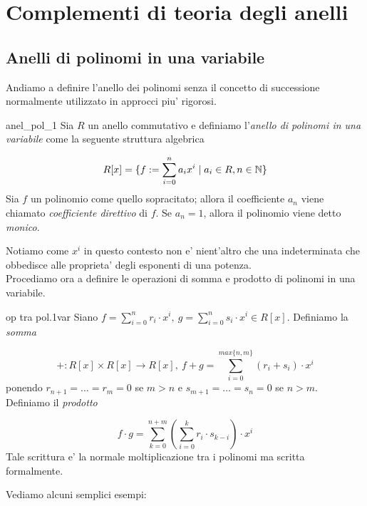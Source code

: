 \section{Complementi di teoria degli anelli}

\subsection{Anelli di polinomi in una variabile}

Andiamo a definire l'anello dei polinomi senza il concetto di successione normalmente 
utilizzato in approcci piu' rigorosi.


\begin{defn}{anel_pol_1}
Sia $R$ un anello commutativo e definiamo l'\emph{anello di polinomi in una variabile}
come la seguente struttura algebrica

\begin{equation}
R[x] = \{ f:= \sum\limits_{i=0}^{n}a_i x^i \mid a_i \in R, n\in \mathbb{N}\} 
\end{equation}
Sia $f$ un polinomio come quello sopracitato; allora il coefficiente $a_n$ viene chiamato 
\emph{coefficiente direttivo} di $f$. Se $a_n=1$, allora il polinomio viene detto \emph{monico}.
\end{defn}
Notiamo come $x^i$ in questo contesto non e' nient'altro che una indeterminata che
obbedisce alle proprieta' degli esponenti di una potenza. \\
Procediamo ora a definire le operazioni di somma e prodotto di polinomi in una variabile.

\begin{defn}{op tra pol.1var}
Siano $f = \sum_{i=0}^{n}r_i \cdot x^i,\ g = \sum_{i=0}^{n}s_i \cdot x^i \in R[x]$. 
Definiamo la \emph{somma}

\begin{equation}
+ : R[x] \times R[x] \to R[x],\ f + g = \sum\limits_{i=0}^{max\{n,m\}} (r_i + s_i) \cdot x^i
\end{equation}
ponendo $r_{n+1} = \dots = r_m = 0$ se $m > n$ e $s_{m+1} = \dots = s_n = 0$ se $n > m$.\\
Definiamo il \emph{prodotto}

\begin{equation}
f\cdot g = \sum\limits_{k=0}^{n+m} (\sum\limits_{i=0}^{k} r_i \cdot s_{k-i}) \cdot x^i
\end{equation}
Tale scrittura e' la normale moltiplicazione tra i polinomi ma scritta formalmente.
\end{defn}
Vediamo alcuni semplici esempi: 

